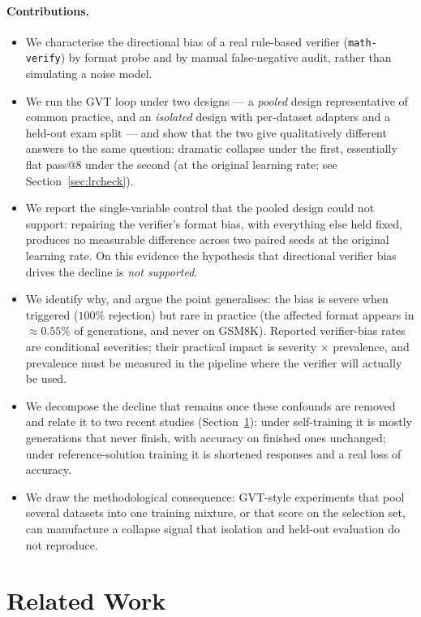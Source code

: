 \documentclass[runningheads]{llncs}
\begin{document}
\paragraph{Contributions.}
\begin{itemize}
\item We characterise the directional bias of a real rule-based verifier
(\texttt{math-verify}) by format probe and by manual false-negative
audit, rather than simulating a noise model.
\item We run the GVT loop under two designs --- a \emph{pooled} design
representative of common practice, and an \emph{isolated} design with
per-dataset adapters and a held-out exam split --- and show that the two
give qualitatively different answers to the same question: dramatic
collapse under the first, essentially flat pass@8 under the second (at the
original learning rate; see Section~\ref{sec:lrcheck}).
\item We report the single-variable control that the pooled design could
not support: repairing the verifier's format bias, with everything else
held fixed, produces no measurable difference across two paired seeds at
the original learning rate. On
this evidence the hypothesis that directional verifier bias drives the
decline is \emph{not supported}.
\item We identify why, and argue the point generalises: the bias is severe
when triggered ($100\%$ rejection) but rare in practice (the affected
format appears in $\approx0.55\%$ of generations, and never on GSM8K).
Reported verifier-bias rates are conditional severities; their practical
impact is severity $\times$ prevalence, and prevalence must be measured in
the pipeline where the verifier will actually be used.
\item We decompose the decline that remains once these confounds are removed
and relate it to two recent studies (Section~\ref{sec:related}): under
self-training it is mostly generations that never finish, with accuracy on
finished ones unchanged; under reference-solution training it is shortened
responses and a real loss of accuracy.
\item We draw the methodological consequence: GVT-style experiments that
pool several datasets into one training mixture, or that score on the
selection set, can manufacture a collapse signal that isolation and
held-out evaluation do not reproduce.
\end{itemize}

\section{Related Work}
\label{sec:related}
\end{document}
